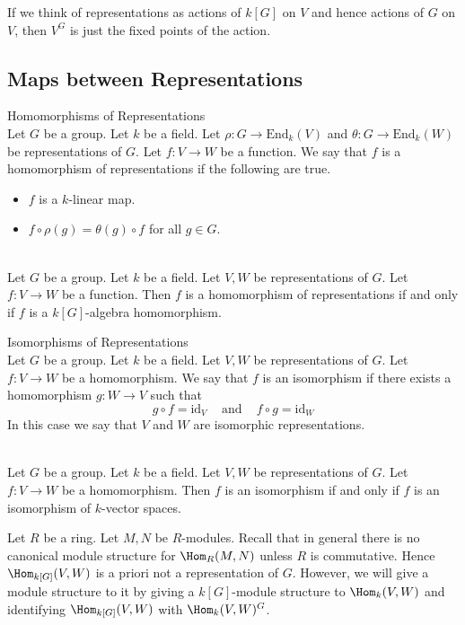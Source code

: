 \documentclass[a4paper]{article}
\begin{document}
If we think of representations as actions of $k[G]$ on $V$ and hence actions of $G$ on $V$, then $V^G$ is just the fixed points of the action. 

\subsection{Maps between Representations}
\begin{defn}{Homomorphisms of Representations}{}\\
Let $G$ be a group. Let $k$ be a field. Let $\rho:G\to\text{End}_k(V)$ and $\theta:G\to\text{End}_k(W)$ be representations of $G$. Let $f:V\to W$ be a function. We say that $f$ is a homomorphism of representations if the following are true. 
\begin{itemize}
\item $f$ is a $k$-linear map. 
\item $f\circ\rho(g)=\theta(g)\circ f$ for all $g\in G$. 
\end{itemize}
\end{defn}

\begin{lmm}{}{}\\
Let $G$ be a group. Let $k$ be a field. Let $V,W$ be representations of $G$. Let $f:V\to W$ be a function. Then $f$ is a homomorphism of representations if and only if $f$ is a $k[G]$-algebra homomorphism. 
\end{lmm}

\begin{defn}{Isomorphisms of Representations}{}\\
Let $G$ be a group. Let $k$ be a field. Let $V,W$ be representations of $G$. Let $f:V\to W$ be a homomorphism. We say that $f$ is an isomorphism if there exists a homomorphism $g:W\to V$ such that $$g\circ f=\text{id}_V\;\;\;\text{ and }\;\;\;f\circ g=\text{id}_W$$ In this case we say that $V$ and $W$ are isomorphic representations. 
\end{defn}

\begin{lmm}{}{}\\
Let $G$ be a group. Let $k$ be a field. Let $V,W$ be representations of $G$. Let $f:V\to W$ be a homomorphism. Then $f$ is an isomorphism if and only if $f$ is an isomorphism of $k$-vector spaces. 
\end{lmm}

Let $R$ be a ring. Let $M,N$ be $R$-modules. Recall that in general there is no canonical module structure for $\Hom_R(M,N)$ unless $R$ is commutative. Hence $\Hom_{k[G]}(V,W)$ is a priori not a representation of $G$. However, we will give a module structure to it by giving a $k[G]$-module structure to $\Hom_k(V,W)$ and identifying $\Hom_{k[G]}(V,W)$ with $\Hom_k(V,W)^G$. 
\end{document}
